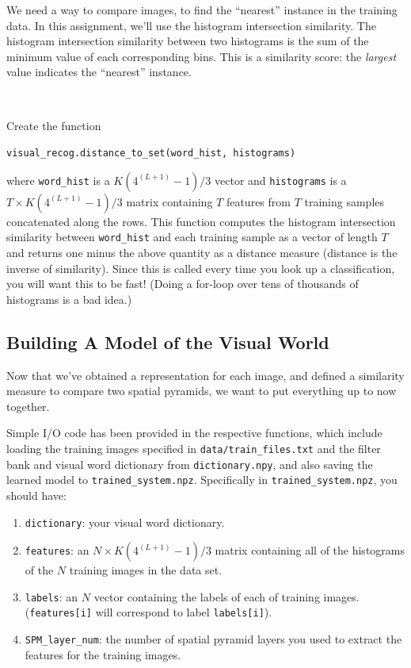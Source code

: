 \documentclass[10pt]{article}
\begin{document}
We need a way to compare images, to find the ``nearest'' instance in the training data.
In this assignment, we'll use the histogram intersection similarity. The histogram
intersection similarity between two histograms is the sum of the minimum value of each corresponding bins.
This is a similarity score: the {\it largest} value indicates the ``nearest'' instance.
\par ~
\par {}
Create the function
\begin{center}
{\tt visual\_recog.distance\_to\_set(word\_hist, histograms)}
\end{center}
where {\tt word\_hist} is a $K\left(4^{(L+1)}-1\right)/3$ vector
and {\tt histograms} is a $T \times K\left(4^{(L+1)}-1\right)/3$ matrix containing $T$ features
from $T$ training samples concatenated along the rows. This function
computes the histogram intersection similarity between {\tt word\_hist}
and each training sample as a vector of length $T$ and returns one minus the above quantity as a distance measure (distance is the inverse of similarity).
Since this is called every time you look up a classification, you will want this to be fast! (Doing a for-loop over tens of thousands of histograms is a bad idea.) 

\subsection{Building A Model of the Visual World}

Now that we've obtained a representation for each image, and defined a similarity measure to compare two spatial pyramids, we want to put everything up to now together.

Simple I/O code has been provided in the respective functions, which include loading the training images specified in {\tt data/train\_files.txt} and the filter bank and visual word dictionary from {\tt dictionary.npy}, and also saving the learned model to {\tt trained\_system.npz}. Specifically in {\tt trained\_system.npz}, you should have:
\begin{enumerate}
\setlength{\parskip}{0pt}
\item {\tt dictionary}: your visual word dictionary.
\item {\tt features}: an $N \times  K\left(4^{(L+1)}-1\right)/3$ matrix containing all of
the histograms of the $N$ training images in the data set.
\item {\tt labels}: an $N$ vector containing the labels
of each of training images. ({\tt features[i]} will correspond to label {\tt labels[i]}).
\item {\tt SPM\_layer\_num}: the number of spatial pyramid layers you used to extract the features for the training images.
\end{enumerate}
\end{document}
